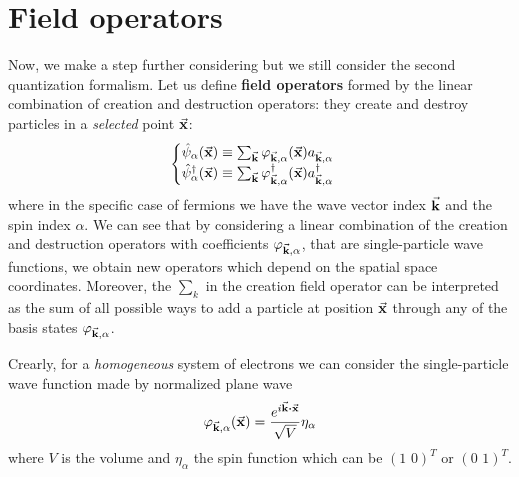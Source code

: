 \documentclass[../main/main.tex]{subfiles}
\begin{document}
\section{Field operators}
Now, we make a step further considering but we still consider the second quantization formalism. Let us define \textbf{field operators} formed by the linear combination of creation and destruction operators: they create and destroy particles in a \emph{selected} point \( \va{x} \): 
\begin{equation}
  \begin{cases}
   \hat{\psi }_ \alpha  (\va{x}) \equiv  \sum_{\va{k}}^{} \varphi _{\va{k}, \alpha } (\va{x}) a_{\va{k}, \alpha }  \\
\hat{\psi }_ \alpha ^\dag   (\va{x}) \equiv  \sum_{\va{k}}^{} \varphi _{\va{k}, \alpha } ^\dag  (\va{x}) a_{\va{k}, \alpha } ^\dag
  \end{cases}
\end{equation}
where in the specific case of fermions we have the wave vector index \( \va{k} \) and the spin index  \( \alpha  \). We can see that by considering a linear combination of the creation and destruction operators with coefficients \(\varphi _{\va{k}, \alpha }   \), that are single-particle wave functions, we obtain new operators which depend on the spatial space coordinates.
Moreover, the \( \sum_{k}^{}   \) in the creation field operator can be interpreted as the sum of all possible ways to add a particle at position \( \va{x} \) through any of the basis states \( \varphi _{\va{k}, \alpha } \).

Crearly, for a \emph{homogeneous} system of electrons we can consider the single-particle wave function made by normalized plane wave
\begin{equation*}
  \varphi _{\va{k}, \alpha } (\va{x}) = \frac{e^{i \va{k} \vdot \va{x}} }{\sqrt{V} } \eta _{\alpha }
\end{equation*}
 where \( V \) is the volume and \( \eta_ \alpha   \) the spin function which can be \( (1 \,\, 0 )^T\) or \( (0\,\, 1 )^T\).
\end{document}
